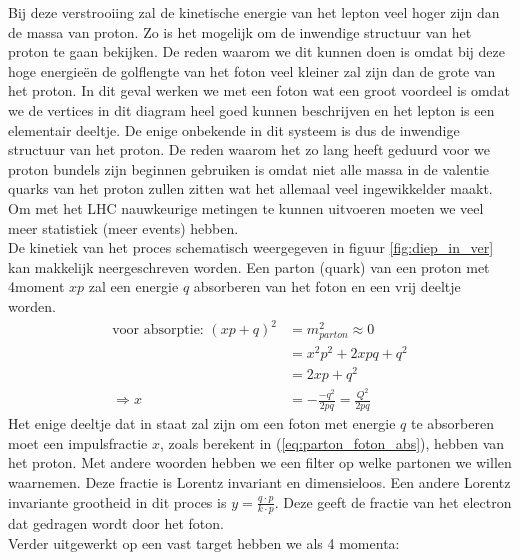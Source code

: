 \documentclass[../main.tex]{subfiles}
\begin{document}
Bij deze verstrooiing zal de kinetische energie van het lepton veel hoger zijn dan de massa van proton. Zo is het mogelijk om de inwendige structuur van het proton te gaan bekijken. De reden waarom we dit kunnen doen is omdat bij deze hoge energieën de golflengte van het foton veel kleiner zal zijn dan de grote van het proton. In dit geval werken we met een foton wat een groot voordeel is omdat we de vertices in dit diagram heel goed kunnen beschrijven en het lepton is een elementair deeltje. De enige onbekende in dit systeem is dus de inwendige structuur van het proton. De reden waarom het zo lang heeft geduurd voor we proton bundels zijn beginnen gebruiken is omdat niet alle massa in de valentie quarks van het proton zullen zitten wat het allemaal veel ingewikkelder maakt. Om met het LHC nauwkeurige metingen te kunnen uitvoeren moeten we veel meer statistiek (meer events) hebben.\\
De kinetiek van het proces schematisch weergegeven in figuur \ref{fig:diep_in_ver} kan makkelijk neergeschreven worden. Een parton (quark) van een proton met 4moment $xp$ zal een energie $q$ absorberen van het foton en een vrij deeltje worden.
\begin{equation}
    \begin{aligned}
        \label{eq:parton_foton_abs}
        \text{voor absorptie: }(xp+q)^2 &= m_{parton}^2 \approx 0\\
                                        &=x^2p^2+2xpq+q^2\\
                                        &=2xp+q^2\\
                          \Rightarrow x &=- \frac{-q^2}{2pq} = \frac{Q^2}{2pq} 
    \end{aligned}
\end{equation}
Het enige deeltje dat in staat zal zijn om een foton met energie $q$ te absorberen moet een impulsfractie $x$, zoals berekent in (\ref{eq:parton_foton_abs}), hebben van het proton. Met andere woorden hebben we een filter op welke partonen we willen waarnemen. Deze fractie is Lorentz invariant en dimensieloos. Een andere Lorentz invariante grootheid in dit proces is $y=\frac{q\cdot p}{k\cdot p}$. Deze geeft de fractie van het electron dat gedragen wordt door het foton.\\
Verder uitgewerkt op een vast target hebben we als 4 momenta:
\end{document}
